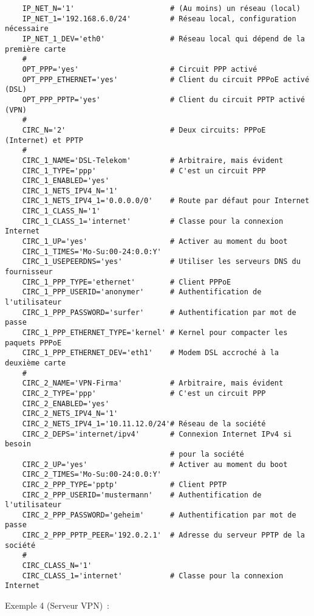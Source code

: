 \begin{example}
\begin{verbatim}
    IP_NET_N='1'                      # (Au moins) un réseau (local)
    IP_NET_1='192.168.6.0/24'         # Réseau local, configuration nécessaire
    IP_NET_1_DEV='eth0'               # Réseau local qui dépend de la première carte
    #
    OPT_PPP='yes'                     # Circuit PPP activé
    OPT_PPP_ETHERNET='yes'            # Client du circuit PPPoE activé (DSL)
    OPT_PPP_PPTP='yes'                # Client du circuit PPTP activé (VPN)
    #
    CIRC_N='2'                        # Deux circuits: PPPoE (Internet) et PPTP
    #
    CIRC_1_NAME='DSL-Telekom'         # Arbitraire, mais évident
    CIRC_1_TYPE='ppp'                 # C'est un circuit PPP
    CIRC_1_ENABLED='yes'
    CIRC_1_NETS_IPV4_N='1'
    CIRC_1_NETS_IPV4_1='0.0.0.0/0'    # Route par défaut pour Internet
    CIRC_1_CLASS_N='1'
    CIRC_1_CLASS_1='internet'         # Classe pour la connexion Internet
    CIRC_1_UP='yes'                   # Activer au moment du boot
    CIRC_1_TIMES='Mo-Su:00-24:0.0:Y'
    CIRC_1_USEPEERDNS='yes'           # Utiliser les serveurs DNS du fournisseur
    CIRC_1_PPP_TYPE='ethernet'        # Client PPPoE
    CIRC_1_PPP_USERID='anonymer'      # Authentification de l'utilisateur
    CIRC_1_PPP_PASSWORD='surfer'      # Authentification par mot de passe
    CIRC_1_PPP_ETHERNET_TYPE='kernel' # Kernel pour compacter les paquets PPPoE
    CIRC_1_PPP_ETHERNET_DEV='eth1'    # Modem DSL accroché à la deuxième carte
    #
    CIRC_2_NAME='VPN-Firma'           # Arbitraire, mais évident
    CIRC_2_TYPE='ppp'                 # C'est un circuit PPP
    CIRC_2_ENABLED='yes'
    CIRC_2_NETS_IPV4_N='1'
    CIRC_2_NETS_IPV4_1='10.11.12.0/24'# Réseau de la société
    CIRC_2_DEPS='internet/ipv4'       # Connexion Internet IPv4 si besoin
                                      # pour la société
    CIRC_2_UP='yes'                   # Activer au moment du boot
    CIRC_2_TIMES='Mo-Su:00-24:0.0:Y'
    CIRC_2_PPP_TYPE='pptp'            # Client PPTP
    CIRC_2_PPP_USERID='mustermann'    # Authentification de l'utilisateur
    CIRC_2_PPP_PASSWORD='geheim'      # Authentification par mot de passe
    CIRC_2_PPP_PPTP_PEER='192.0.2.1'  # Adresse du serveur PPTP de la société
    #
    CIRC_CLASS_N='1'
    CIRC_CLASS_1='internet'           # Classe pour la connexion Internet
\end{verbatim}
\end{example}

\noindent
Exemple 4 (Serveur VPN)~:

